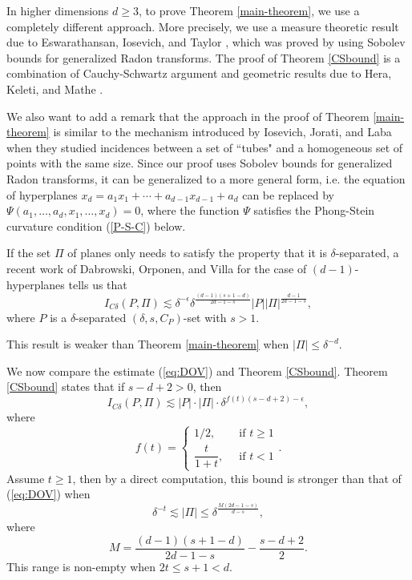 \documentclass[11pt]{article}
\newcommand{\1}{\mathbf{1}}
\begin{document}
In higher dimensions $d\ge 3$, to prove Theorem \ref{main-theorem}, we use a completely different approach. More precisely, we use a measure theoretic result due to Eswarathansan, Iosevich, and Taylor \cite{Alex}, which was proved by using Sobolev bounds for generalized Radon transforms. The proof of Theorem \ref{CSbound} is a combination of Cauchy-Schwartz  argument and geometric results due to Hera, Keleti, and Mathe \cite{HKM}. 

We also want to add a remark that the approach in the proof of Theorem \ref{main-theorem} is similar to the mechanism introduced by Iosevich, Jorati, and Laba \cite{III} when they studied incidences between a set of ``tubes" and a homogeneous set of points with the same size. Since our proof uses Sobolev bounds for generalized Radon transforms, it can be generalized to a more general form, i.e. the equation of hyperplanes $x_d=a_1x_1+\cdots+a_{d-1}x_{d-1}+a_d$ can be replaced by $\Psi(a_1, \ldots, a_d, x_1, \ldots, x_d)=0$, where the function $\Psi$ satisfies the Phong-Stein curvature condition (\ref{P-S-C}) below.

If the set $\Pi$ of planes  only needs to satisfy the property that it is $\delta$-separated, a recent work of Dabrowski, Orponen, and Villa \cite{DOV} for the case of $(d-1)$-hyperplanes tells us that 
\begin{equation}\label{eq:DOV}I_{C\delta}(P, \Pi)\lesssim \delta^{-\epsilon}\delta^{\frac{(d-1)(s+1-d)}{2d-1-s}}|P||\Pi|^{\frac{d-1}{2d-1-s}},\end{equation}
where $P$ is a $\delta$-separated $(\delta, s, C_P)$-set with $s>1$.

This result is weaker than Theorem \ref{main-theorem} when $|\Pi|\le \delta^{-d}$. 

We now compare the estimate (\ref{eq:DOV}) and Theorem \ref{CSbound}. Theorem \ref{CSbound} states that if $s-d+2>0$, then 
\[I_{C\delta}(P,\Pi)\lesssim  |P|\cdot|\Pi|\cdot \delta^{f(t)(s-d+2) - \epsilon},\] where  \[
        f(t) =
        \begin{cases}
        1/2,  ~&\text{ if } t\ge 1\\
        \dfrac{t}{1+t}, ~&\text{ if } t<1
        \end{cases}.\]
Assume $t\ge 1$, then by a direct computation, this bound is stronger than that of (\ref{eq:DOV}) when 
\[\delta^{-t}\lesssim |\Pi|\le \delta^{\frac{M(2d-1-s)}{d-s}},\]
where 
\[M=\frac{(d-1)(s+1-d)}{2d-1-s}-\frac{s-d+2}{2}.\]
This range is non-empty when $2t\le s+1<d$.
\end{document}
